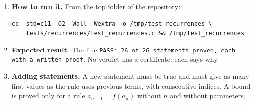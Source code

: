 \documentclass[11pt,a4paper]{article}
\begin{document}
\begin{enumerate}
\item \textbf{How to run it.} From the top folder of the repository:
\begin{verbatim}
cc -std=c11 -O2 -Wall -Wextra -o /tmp/test_recurrences \
    tests/recurrences/test_recurrences.c && /tmp/test_recurrences
\end{verbatim}

\item \textbf{Expected result.} The line \texttt{PASS: 26 of 26 statements proved, each with a written proof}. No verdict has a certificate: each says why.

\item \textbf{Adding statements.} A new statement must be true and must give as many first values as the rule uses previous terms, with consecutive indices. A bound is proved only for a rule $a_{n+1} = f(a_n)$ without $n$ and without parameters.
\end{enumerate}
\end{document}
